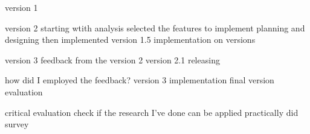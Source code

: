 

version 1


version 2
starting wtith analysis
selected the features to implement 
planning and designing
then implemented version 1.5
implementation on versions 

version 3
feedback from the version 2
version 2.1 releasing

how did I employed the feedback?
version 3 implementation
final version evaluation


critical evaluation
check if the research I've done can be applied practically
did survey


